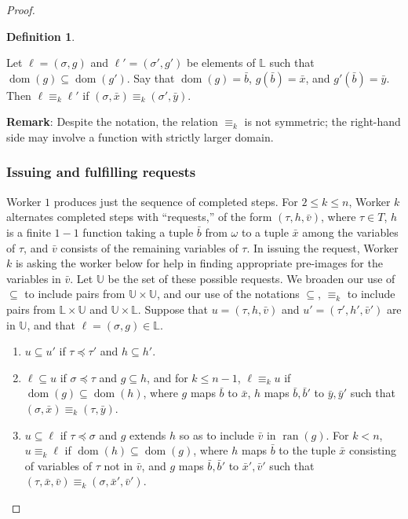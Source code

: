 \documentclass[10pt,a4paper]{article}
\DeclareMathOperator{\dom}{dom}
\DeclareMathOperator{\ran}{ran}
\theoremstyle{definition}
\newtheorem{defn}[thm]{Definition}
\begin{document}
\begin{proof}
		\begin{defn}\label{def-equiv-g}
			
			Let $\ell = (\sigma,g)$ and $\ell' = (\sigma',g')$ be elements of $\mathbb{L}$ such that $\dom(g)\subseteq \dom(g')$. Say that $\dom(g) = \bar{b}$, $g(\bar{b}) = \bar{x}$, and $g'(\bar{b}) = \bar{y}$. 
			Then $\ell\equiv_k\ell'$ if $(\sigma,\bar{x})\equiv_k (\sigma',\bar{y})$. 
			
		\end{defn}
		
		\noindent
		\textbf{Remark}: Despite the notation, the relation $\equiv_k$ is not symmetric; the right-hand side may involve a function with strictly larger domain. 
		
		\subsubsection{Issuing and fulfilling requests}
		
		Worker $1$ produces just the sequence of completed steps. For $2\leq k\leq n$, Worker $k$ alternates completed steps with ``requests,'' of the form $(\tau,h,\bar{v})$, where $\tau\in T$, $h$ is a finite $1-1$ function taking a tuple $\bar{b}$ from $\omega$ to a tuple $\bar{x}$ among the variables of $\tau$, and $\bar{v}$ consists of the remaining variables of $\tau$. In issuing the request, Worker $k$ is asking the worker below for help in finding appropriate pre-images for the variables in $\bar{v}$. Let $\mathbb{U}$ be the set of these possible requests. 
We broaden our use of $\subseteq$ to include pairs from $\mathbb{U}\times\mathbb{U}$, and our use of the notations $\subseteq$, $\equiv_k$ to include pairs from $\mathbb{L}\times\mathbb{U}$ and $\mathbb{U}\times\mathbb{L}$. Suppose that $u = (\tau,h,\bar{v})$ and $u' = (\tau',h',\bar{v}')$ are in $\mathbb{U}$, and that $\ell = (\sigma,g)\in\mathbb{L}$. 
		
		\begin{enumerate}
			
			\item $u\subseteq u'$ if $\tau\preceq\tau'$ and $h\subseteq h'$.
			
			\item $\ell\subseteq u$ if $\sigma\preceq\tau$ and $g\subseteq h$, and for $k\leq n-1$, $\ell\equiv_k u$ if $\dom(g)\subseteq \dom(h)$, where $g$ maps $\bar{b}$ to $\bar{x}$, $h$ maps $\bar{b},\bar{b}'$ to $\bar{y},\bar{y}'$ such that $(\sigma,\bar{x})\equiv_k (\tau,\bar{y})$. 
			
			\item $u\subseteq\ell$ if $\tau\preceq\sigma$ and $g$ extends $h$ so as to include $\bar{v}$ in $\ran(g)$. For $k < n$, $u\equiv_k\ell$ if $\dom(h)\subseteq \dom(g)$, where $h$ maps $\bar{b}$ to the tuple $\bar{x}$ consisting of variables of $\tau$ not in $\bar{v}$, and $g$ maps $\bar{b},\bar{b}'$ to $\bar{x}',\bar{v}'$ such that $(\tau,\bar{x},\bar{v})\equiv_k(\sigma,\bar{x}',\bar{v}')$. 
			

\end{enumerate}
\end{proof}
\end{document}
